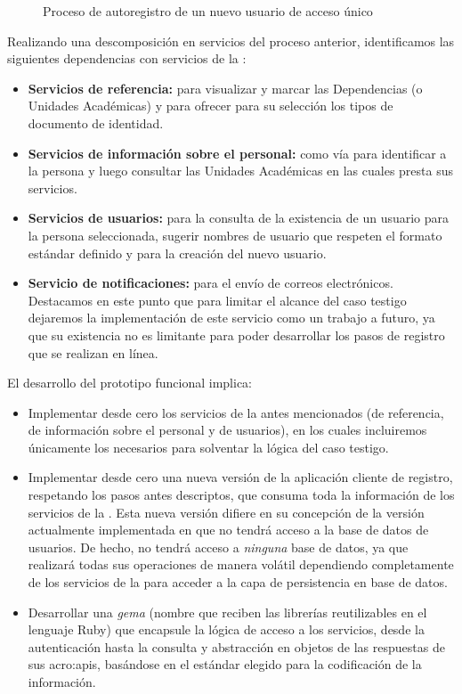 \begin{figure}[H]
  \caption{Proceso de autoregistro de un nuevo usuario de acceso único}
  \label{fig:diagrama-flujo-registro}
\end{figure}

Realizando una descomposición en servicios del proceso anterior, identificamos las siguientes dependencias con servicios de la {\cloud}:

\begin{itemize}
  \item \textbf{Servicios de referencia:} para visualizar y marcar las Dependencias (o Unidades Académicas) y para ofrecer para su selección los tipos de documento de identidad.

  \item \textbf{Servicios de información sobre el personal:} como vía para identificar a la persona y luego consultar las Unidades Académicas en las cuales presta sus servicios.

  \item \textbf{Servicios de usuarios:} para la consulta de la existencia de un usuario para la persona seleccionada, sugerir nombres de usuario que respeten el formato estándar definido y para la creación del nuevo usuario.

  \item \textbf{Servicio de notificaciones:} para el envío de correos electrónicos. Destacamos en este punto que para limitar el alcance del caso testigo dejaremos la implementación de este servicio como un trabajo a futuro, ya que su existencia no es limitante para poder desarrollar los pasos de registro que se realizan en línea.
\end{itemize}

El desarrollo del prototipo funcional implica:

\begin{itemize}
  \item Implementar desde cero los servicios de la {\cloud} antes mencionados (de referencia, de información sobre el personal y de usuarios), en los cuales incluiremos únicamente los  necesarios para solventar la lógica del caso testigo.

  \item Implementar desde cero una nueva versión de la aplicación cliente de registro, respetando los pasos antes descriptos, que consuma toda la información de los servicios de la {\cloud}. Esta nueva versión difiere en su concepción de la versión actualmente implementada en que no tendrá acceso a la base de datos de usuarios. De hecho, no tendrá acceso a \textit{ninguna} base de datos, ya que realizará todas sus operaciones de manera volátil dependiendo completamente de los servicios de la {\cloud} para acceder a la capa de persistencia en base de datos.

  \item Desarrollar una \textit{gema} (nombre que reciben las librerías reutilizables en el lenguaje Ruby) que encapsule la lógica de acceso a los servicios, desde la autenticación hasta la consulta y abstracción en objetos de las respuestas de sus \glspl{acro:api}, basándose en el estándar elegido para la codificación de la información.
\end{itemize}


